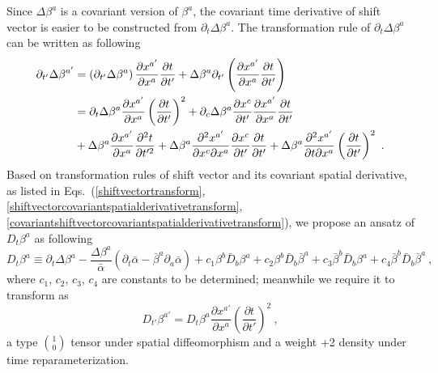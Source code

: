 Since $\Delta \beta^{a}$ is a covariant version of $\beta^{a}$, the covariant time derivative of shift vector is easier to be constructed from $\partial_{t}\Delta \beta^{a}$. The transformation rule of $\partial_{t}\Delta \beta^{a}$ can be written as following
\begin{align}\label{covariantshifttimederivative} 
\partial_{t'}\Delta \beta^{a'} & = \left(\partial_{t'}\Delta \beta^{a}\right)\frac{\partial x^{a'}}{\partial x^{a}}\frac{\partial t}{\partial t'} + \Delta \beta^{a}\partial_{t'}\left(\frac{\partial x^{a'}}{\partial x^{a}}\frac{\partial t}{\partial t'}\right)\notag\\
& = \partial_{t}\Delta \beta^{a}\frac{\partial x^{a'}}{\partial x^{a}}\left(\frac{\partial t}{\partial t'}\right)^{2} + \partial_{c}\Delta \beta^{a}\frac{\partial x^{c}}{\partial t'}\frac{\partial x^{a'}}{\partial x^{a}}\frac{\partial t}{\partial t'}\notag\\
& + \Delta \beta^{a}\frac{\partial x^{a'}}{\partial x^{a}}\frac{\partial^{2}t}{\partial t'^{2}} + \Delta \beta^{a}\frac{\partial^{2} x^{a'}}{\partial x^{c}\partial x^{a}}\frac{\partial x^{c}}{\partial t'}\frac{\partial t}{\partial t'} + \Delta \beta^{a}\frac{\partial^{2}x^{a'}}{\partial t\partial x^{a}}\left(\frac{\partial t}{\partial t'}\right)^{2} \ .
\end{align}
Based on transformation rules of shift vector and its covariant spatial derivative, as listed in Eqs.~(\ref{shiftvectortransform}, \ref{shiftvectorcovariantspatialderivativetransform}, \ref{covariantshiftvectorcovariantspatialderivativetransform}), we propose an ansatz of $D_{t}\beta^{a}$ as following
\begin{equation}
	D_{t}\beta^{a} \equiv \partial_{t}\Delta \beta^{a} - \frac{\Delta \beta^{a}}{{\bar \alpha}}\left(\partial_{t}{\bar \alpha} - {\bar \beta}^{a}\partial_{a}{\bar \alpha}\right) + c_{1}\beta^{b}{\bar D}_{b}\beta^{a} + c_{2}\beta^{b}{\bar D}_{b}{\bar \beta}^{a} + c_{3}{\bar \beta}^{b}{\bar D}_{b}\beta^{a} + c_{4}{\bar \beta}^{b}{\bar D}_{b}{\bar \beta}^{a}	\ ,
\end{equation}
where $c_{1}$, $c_{2}$, $c_{3}$, $c_{4}$ are constants to be determined; meanwhile we require it to transform as
\begin{equation}
	D_{t'}\beta^{a'} = D_{t}\beta^{a}\frac{\partial x^{a'}}{\partial x^{a}}\left(\frac{\partial t}{\partial t'}\right)^{2} \ ,
\end{equation}
a type $1 \choose 0$ tensor under spatial diffeomorphism and a weight +2 density under time reparameterization. 

